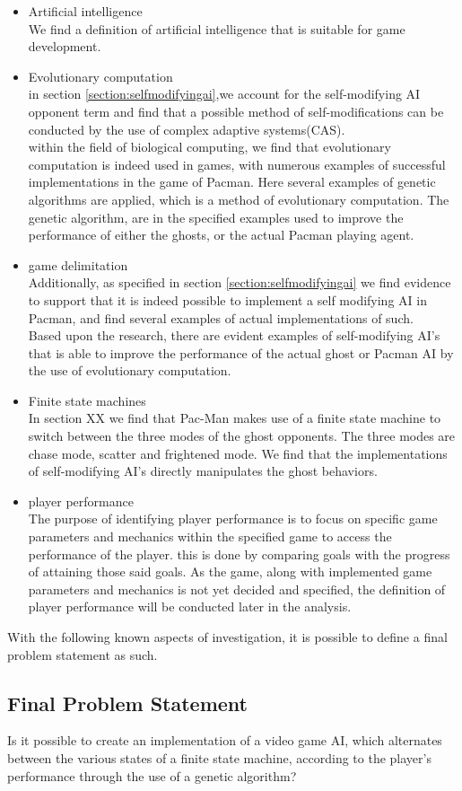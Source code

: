 \begin{itemize}
\item Artificial intelligence\\
We find a definition of artificial intelligence that is suitable for game development. 

\item Evolutionary computation\\
in section \ref{section:selfmodifyingai},we account for the self-modifying AI opponent term and find that a possible method of self-modifications can be conducted by the use of complex adaptive systems(CAS).\\

within the field of biological computing, we find that evolutionary computation is indeed used in games, with numerous examples of successful implementations in the game of Pacman. Here several examples of genetic algorithms are applied, which is a method of evolutionary computation. The genetic algorithm, are in the specified examples used to improve the performance of either the ghosts, or the actual Pacman playing agent.
\item game delimitation\\
Additionally, as specified in section \ref{section:selfmodifyingai} we find evidence to support that it is indeed possible to implement a self modifying AI in Pacman, and find several examples of actual implementations of such.\\

Based upon the research, there are evident examples of self-modifying AI's that is able to improve the performance of the actual ghost or Pacman AI by the use of evolutionary computation. 
\item Finite state machines\\
In section XX we find that Pac-Man makes use of a finite state machine to switch between the three modes of the ghost opponents. The three modes are chase mode, scatter and frightened mode. We find that the implementations of self-modifying AI's directly manipulates the ghost behaviors. 

\item player performance\\
The purpose of identifying player performance is to focus on specific game parameters and mechanics within the specified game to access the performance of the player. this is done by comparing goals with the progress of attaining those said goals. As the game, along with implemented game parameters and mechanics is not yet decided and specified, the definition of player performance will be conducted later in the analysis.
\end{itemize}

With the following known aspects of investigation, it is possible to define a final problem statement as such.


\subsection{Final Problem Statement} \label{sec:finalproblemstatement}
Is it possible to create an implementation of a video game AI, which alternates between the various states of a finite state machine, according to the player's performance through the use of a genetic algorithm?
